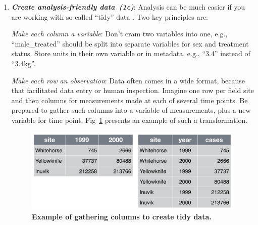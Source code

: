 \documentclass[10pt,letterpaper]{article}
\newcommand{\practice}[2]{\textbf{\emph{{#2}~({#1})}}}
\begin{document}
\begin{enumerate}
  \emph{File formats}: Convert data from closed, proprietary formats
  to open, non-proprietary formats that ensure machine readability
  across time and computing setups \cite{ffIllinois}. Good options
  include CSV for tabular data, JSON, YAML, or XML for non-tabular
  data such as graphs\footnote{The node-and-arc kind.}, and HDF5 for
  certain kinds of structured data.

  \emph{Variable names}: Replace inscrutable variable names and
  artificial data codes with self-explaining alternatives, e.g.,
  rename variables called \texttt{name1} and \texttt{name2} to
  \texttt{personal\_name} and \texttt{family\_name}, recode the
  treatment variable from \texttt{1} vs.  \texttt{2} to
  \texttt{untreated} vs. \texttt{treated}, and replace artificial
  codes for missing data, such as ``-99'', with \texttt{NA}, a code
  used in most programming languages to indicate that data is ``Not
  Available'' \cite{white2013}.

  \emph{Filenames}: Store especially useful metadata as part of the
  filename itself, while keeping the filename regular enough for easy
  pattern matching. For example, a filename like
  \texttt{2016-05-alaska-b.csv} makes it easy for both people and
  programs to select by year or by location.

\item

  \practice{1c}{Create analysis-friendly data}: Analysis can be much
  easier if you are working with so-called ``tidy'' data
  \cite{wickham2014}. Two key principles are:

  \emph{Make each column a variable}: Don't cram two variables into
  one, e.g., ``male\_treated'' should be split into separate variables
  for sex and treatment status.  Store units in their own variable or
  in metadata, e.g., ``3.4'' instead of ``3.4kg''.

  \emph{Make each row an observation}: Data often comes in a wide
  format, because that facilitated data entry or human
  inspection. Imagine one row per field site and then columns for
  measurements made at each of several time points. Be prepared to
  gather such columns into a variable of measurements, plus a new
  variable for time point.  Fig~\ref{fig:tidy} presents an example
  of such a transformation.

  \begin{figure} 
   \includegraphics[width = 5in]{tidy-data.png}
    \caption{\textbf{Example of gathering columns to create tidy data.}}
    \label{fig:tidy}
  \end{figure}


\end{enumerate}
\end{document}
